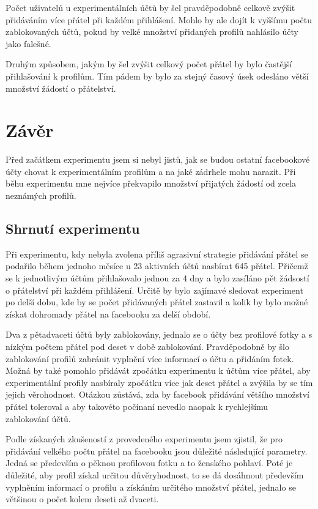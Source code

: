 \documentclass[thesis=M,czech]{FITthesis}[2013/05/10]
\begin{document}
Počet uživatelů u experimentálních účtů by šel pravděpodobně celkově zvýšit přidáváním více přátel při každém přihlášení. Mohlo by ale dojít k vyššímu počtu zablokovaných účtů, pokud by velké množství přidaných profilů nahlásilo účty jako  falešné.

Druhým způsobem, jakým by šel zvýšit celkový počet přátel by bylo častější přihlašování k profilům. Tím pádem by bylo za stejný časový úsek odesláno větší množství žádostí o přátelství.


\chapter{Z{\' a}v{\v e}r}

Před začátkem experimentu jsem si nebyl jistů, jak se budou ostatní facebookové účty chovat k experimentálním profilům a na jaké zádrhele mohu narazit. Při běhu experimentu mne nejvíce překvapilo množství přijatých žádostí od zcela neznámých profilů.

\section{Shrnutí experimentu}

Při experimentu, kdy nebyla zvolena příliš agrasivní strategie přidávání přátel se podařilo během jednoho měsíce u 23 aktivních účtů nasbírat 645 přátel. Přičemž se k jednotlivým účtům přihlašovalo jednou za 4 dny a bylo zasíláno pět žádsostí o přátelství při každém přihlášení. Určitě by bylo zajímavé sledovat experiment po delší dobu, kde by se počet přidávaných přátel zastavil a kolik by bylo možné získat dohromady přátel na facebooku za delší období.

Dva z pětadvaceti účtů byly zablokovány, jednalo se o účty bez profilové fotky a s nízkým počtem přátel pod deset v době zablokování. Pravděpodobně by šlo zablokování profilů zabránit vyplnění více informací o účtu a přidáním fotek. Možná by také pomohlo přidávát zpočátku experimentu k účtům více přátel, aby experimentální profily nasbíraly zpočátku více jak deset přátel a zvýšila by se tím jejich věrohodnost. Otázkou zůstává, zda by facebook přidávání většího množství přátel toleroval a aby takovéto počínaní nevedlo naopak k rychlejšímu zablokování účtů.

Podle získaných zkušeností z provedeného experimentu jsem zjistil, že pro přidávání velkého počtu přátel na facebooku jsou důležité následující parametry. Jedná se především o pěknou profilovou fotku a to ženského pohlaví. Poté je důležité, aby profil získal určitou důvěryhodnost, to se dá dosáhnout především vyplněním informací o profilu a získáním určitého množství přátel, jednalo se většinou o počet kolem deseti až dvaceti.
\end{document}
